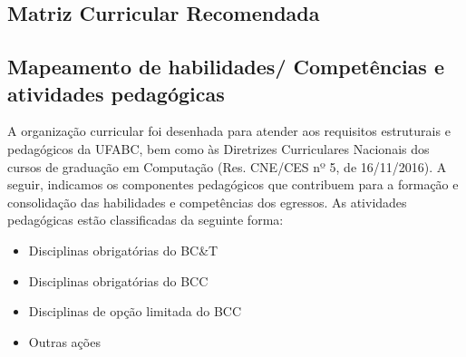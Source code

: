 \newpage

\subsection{Matriz Curricular Recomendada}

\resizebox{\textwidth}{!}{}


\newpage

\subsection{Mapeamento de habilidades/ Competências e atividades pedagógicas}

A organização curricular foi desenhada para atender aos requisitos estruturais
e pedagógicos da UFABC, bem como às Diretrizes Curriculares Nacionais dos
cursos de graduação em Computação (Res. CNE/CES nº 5, de 16/11/2016).
A seguir, indicamos os componentes pedagógicos que contribuem para a formação e
consolidação das habilidades e competências dos egressos.
As atividades pedagógicas estão classificadas da seguinte forma:

\begin{itemize}
    \item \textcolor{nred}{Disciplinas obrigatórias do BC\&T}
    \item \textcolor{nblue}{Disciplinas obrigatórias do BCC}
    \item \textcolor{nyellow}{Disciplinas de opção limitada do BCC}
    \item \textcolor{npurple}{Outras ações}
\end{itemize}



